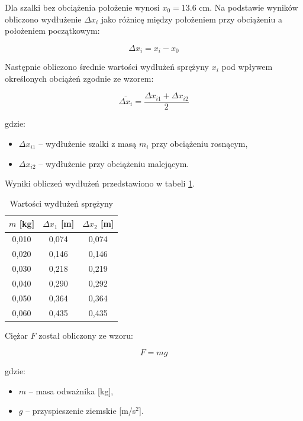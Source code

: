 \documentclass[a4paper,12pt]{article}
\begin{document}
Dla szalki bez obciążenia położenie wynosi $x_0 = 13.6$ cm.
Na podstawie wyników obliczono wydłużenie $\Delta x_i$ jako różnicę między położeniem przy obciążeniu a położeniem początkowym:

\begin{equation}
    \label{eq:wydluzenie}
    \Delta x_i = x_i - x_0
\end{equation}

Następnie obliczono średnie wartości wydłużeń sprężyny \(x_i\) pod wpływem określonych obciążeń zgodnie ze wzorem:

\begin{equation*}
    \overline{\Delta x_i} = \frac{\Delta x_{i1} + \Delta x_{i2}}{2}
\end{equation*}

gdzie:
\begin{itemize}
    \setlength{\itemsep}{0em}
    \item \(\Delta x_{i1}\) -- wydłużenie szalki z masą \(m_i\) przy obciążeniu rosnącym,
    \item \(\Delta x_{i2}\) -- wydłużenie przy obciążeniu malejącym.
\end{itemize}

Wyniki obliczeń wydłużeń przedstawiono w tabeli \ref{tab:delta_x}.

\begin{table}[H]
    \centering
    \begin{tabular}{|c|c|c|}
        \hline
        $m$ [kg] & $\Delta x_1$ [m] & $\Delta x_2$ [m] \\
        \hline
        0,010 & 0,074 & 0,074 \\
        0,020 & 0,146 & 0,146 \\
        0,030 & 0,218 & 0,219 \\
        0,040 & 0,290 & 0,292 \\
        0,050 & 0,364 & 0,364 \\
        0,060 & 0,435 & 0,435 \\
        \hline
    \end{tabular}
    \caption{Wartości wydłużeń sprężyny}
    \label{tab:delta_x}
\end{table}

Ciężar $F$ został obliczony ze wzoru:

\begin{equation*}
    F = mg
\end{equation*}

gdzie:
\begin{itemize}
    \setlength{\itemsep}{0em}
    \item $m$ -- masa odważnika [kg],
    \item $g$ -- przyspieszenie ziemskie [m/s$^2$].
\end{itemize}
\end{document}
